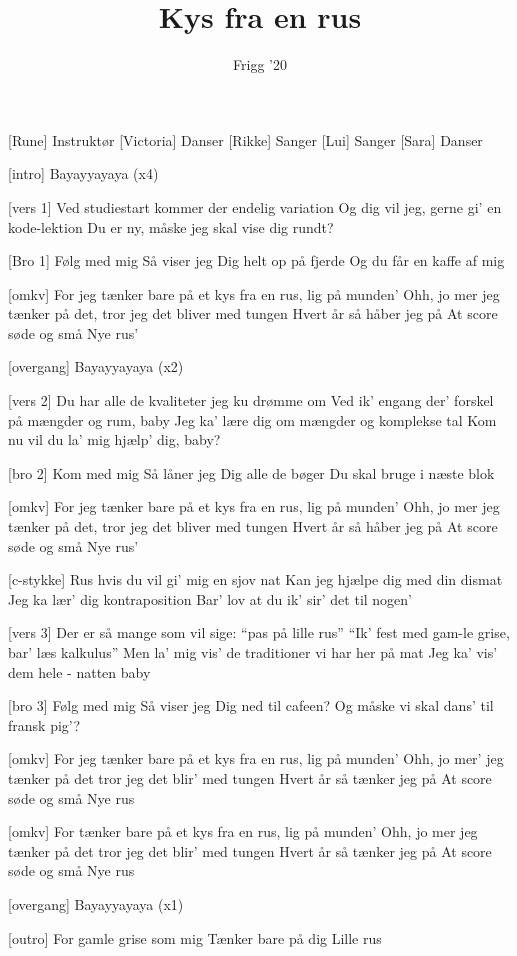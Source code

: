 \documentclass[a4paper,11pt]{article}
\title{Kys fra en rus}
\author{Frigg '20}
\begin{document}
\maketitle

\begin{roles}
[Rune] Instruktør
[Victoria] Danser
[Rikke] Sanger
[Lui] Sanger
[Sara] Danser
\end{roles}

\begin{props}
\end{props}


\begin{song}
[intro]
Bayayyayaya (x4)

[vers 1]
Ved studiestart kommer der endelig variation
Og dig vil jeg, gerne gi' en kode-lektion
Du er ny, måske jeg skal vise dig rundt?

[Bro 1]
Følg med mig
Så viser jeg
Dig helt op på fjerde
Og du får en kaffe af mig

[omkv]
For jeg tænker bare på et kys fra en rus, lig på munden'
Ohh, jo mer jeg tænker på det, tror jeg det bliver med tungen
Hvert år så håber jeg på
At score søde og små
Nye rus'

[overgang]
Bayayyayaya (x2)

[vers 2]
Du har alle de kvaliteter jeg ku drømme om
Ved ik' engang der' forskel på mængder og rum, baby
Jeg ka' lære dig om mængder og komplekse tal
Kom nu vil du la' mig hjælp' dig, baby?

[bro 2]
Kom med mig
Så låner jeg
Dig alle de bøger
Du skal bruge i næste blok

[omkv]
For jeg tænker bare på et kys fra en rus, lig på munden'
Ohh, jo mer jeg tænker på det, tror jeg det bliver med tungen
Hvert år så håber jeg på
At score søde og små
Nye rus'

[c-stykke]
Rus hvis du vil gi' mig en sjov nat
Kan jeg hjælpe dig med din dismat
Jeg ka lær' dig kontraposition
Bar' lov at du ik' sir' det til nogen'

[vers 3]
Der er så mange som vil sige: “pas på lille rus”
“Ik' fest med gam-le grise, bar' læs kalkulus”
Men la' mig vis' de traditioner vi har her på mat
Jeg ka' vis' dem hele - natten baby

[bro 3]
Følg med mig
Så viser jeg
Dig ned til cafeen?
Og måske vi skal dans' til fransk pig'?

[omkv]
For jeg tænker bare på et kys fra en rus, lig på munden'
Ohh, jo mer' jeg tænker på det tror jeg det blir' med tungen
Hvert år så tænker jeg på
At score søde og små
Nye rus

[omkv]
For tænker bare på et kys fra en rus, lig på munden'
Ohh, jo mer jeg tænker på det tror jeg det blir' med tungen
Hvert år så tænker jeg på
At score søde og små
Nye rus

[overgang]
Bayayyayaya (x1)

[outro]
For gamle grise som mig
Tænker bare på dig
Lille rus
\end{song}
\end{document}

